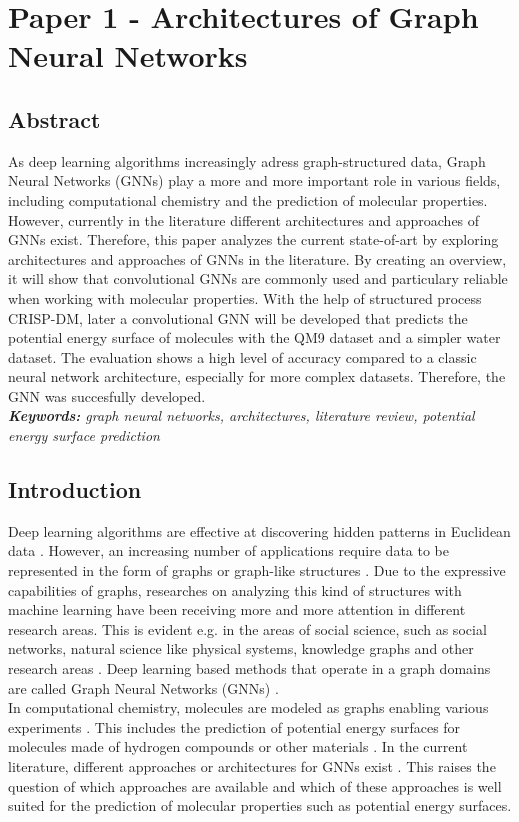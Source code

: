 
\chapter{Paper 1 - Architectures of Graph Neural Networks}

\section*{Abstract}

As deep learning algorithms increasingly adress graph-structured data, Graph Neural Networks (GNNs) play a more and more important role in various fields, including computational chemistry and the prediction of molecular properties. However, currently in the literature different architectures and approaches of GNNs exist. Therefore, this paper analyzes the current state-of-art by exploring architectures and approaches of GNNs in the literature. By creating an overview, it will show that convolutional GNNs are commonly used and particulary reliable when working with molecular properties. With the help of structured process CRISP-DM, later a convolutional GNN will be developed that predicts the potential energy surface of molecules with the QM9 dataset and a simpler water dataset. The evaluation shows a high level of accuracy compared to a classic neural network architecture, especially for more complex datasets. Therefore, the GNN was succesfully developed. \\


\textit{\textbf{Keywords:} graph neural networks, architectures, literature review, potential energy surface prediction}

\section{Introduction}
Deep learning algorithms are effective at discovering hidden patterns in Euclidean data \cite{bronstein2017geometric}. However, an increasing number of applications require data to be represented in the form of graphs or graph-like structures \cite{wu_comprehensive_2021}. Due to the expressive capabilities of graphs, researches on analyzing this kind of structures with machine learning have been receiving more and more attention in different research areas. This is evident e.g. in the areas of social science, such as social networks, natural science like physical systems, knowledge graphs and other research areas \cite{zhou_graph_2020}. Deep learning based methods that operate in a graph domains are called Graph Neural Networks (GNNs) \cite{velickovic_everything_2023}. \\ 
In computational chemistry, molecules are modeled as graphs enabling various experiments \cite{wu_comprehensive_2021}. This includes the prediction of potential energy surfaces for  molecules made of hydrogen compounds or other materials \cite{liu_computational_2023}. In the current literature, different approaches or architectures for GNNs exist \cite{wu_comprehensive_2021}. This raises the question of which approaches are available and which of these approaches is well suited for the prediction of molecular properties such as potential energy surfaces. \\

